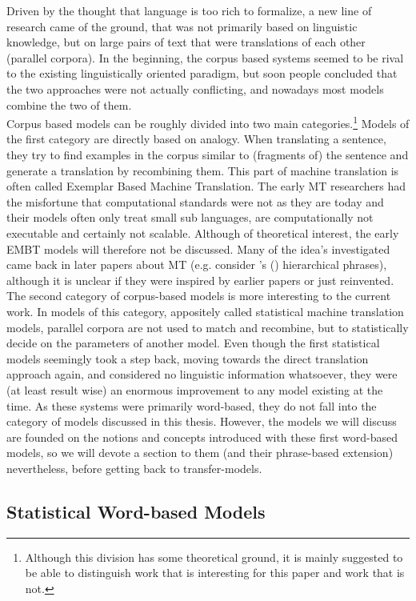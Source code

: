 \documentclass{report}
\theoremstyle{definition}
\theoremstyle{plain}
\def\citepos#1{\citeauthor{#1}'s (\citeyear{#1})}
\begin{document}
Driven by the thought that language is too rich to formalize, a new line of research came of the ground, that was not primarily based on linguistic knowledge, but on large pairs of text that were translations of each other (parallel corpora). In the beginning, the corpus based systems seemed to be rival to the existing linguistically oriented paradigm, but soon people concluded that the two approaches were not actually conflicting, and nowadays most models combine the two of them.\\
Corpus based models can be roughly divided into two main categories.\footnote{Although this division has some theoretical ground, it is mainly suggested to be able to distinguish work that is interesting for this paper and work that is not.} Models of the first category are directly based on analogy. When translating a sentence, they try to find examples in the corpus similar to (fragments of) the sentence and generate a translation by recombining them. This part of machine translation is often called Exemplar Based Machine Translation. The early MT researchers had the misfortune that computational standards were not as they are today and their models often only treat small sub languages, are computationally not executable and certainly not scalable. Although of theoretical interest, the early EMBT models will therefore not be discussed. Many of the idea's investigated came back in later papers about MT (e.g. consider \citepos{furuse1992example} hierarchical phrases), although it is unclear if they were inspired by earlier papers or just reinvented.\\
The second category of corpus-based models is more interesting to the current work. In models of this category, appositely called statistical machine translation models, parallel corpora are not used to match and recombine, but to statistically decide on the parameters of another model. Even though the first statistical models seemingly took a step back, moving towards the direct translation approach again, and considered no linguistic information whatsoever, they were (at least result wise) an enormous improvement to any model existing at the time. As these systems were primarily word-based, they do not fall into the category of models discussed in this thesis. However, the models we will discuss are founded on the notions and concepts introduced with these first word-based models, so we will devote a section to them (and their phrase-based extension) nevertheless, before getting back to transfer-models.

\subsection{Statistical Word-based Models}
\end{document}
